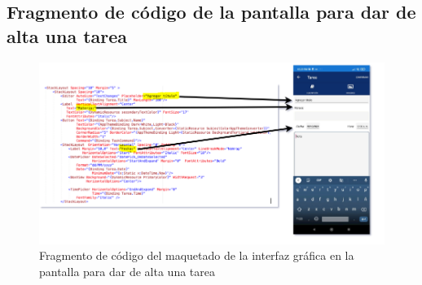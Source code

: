\documentclass[10pt]{article}
\begin{document}
\subsection{Fragmento de código de la pantalla para dar de alta una tarea}
\begin{figure}[H]
    \begin{center}
        \includegraphics[width=1\textwidth]{Imagenes/tareas.png}
        \caption{Fragmento de código del maquetado de la interfaz gráfica en la pantalla para dar de alta una tarea}
        \label{fig19}
    \end{center}
\end{figure}
\end{document}
